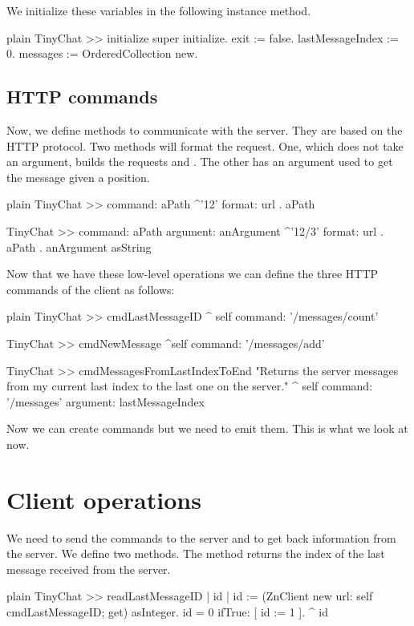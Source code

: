 \documentclass[10pt,twoside,english]{_support/latex/sbabook/sbabook}
\begin{document}
We initialize these variables in the following instance  method.

\begin{displaycode}{plain}
TinyChat >> initialize
	super initialize.
	exit := false.
	lastMessageIndex := 0.
	messages := OrderedCollection new.
\end{displaycode}
\subsection{HTTP commands}
Now, we define methods to communicate with the server. They are based on the HTTP protocol.
Two methods will format the request. One, which does not take an argument, builds the requests
 and . The other has an argument used to get the message given a position.

\begin{displaycode}{plain}
TinyChat >> command: aPath
	^'{1}{2}' format: { url . aPath }

TinyChat >> command: aPath argument: anArgument
	^'{1}{2}/{3}' format: { url . aPath . anArgument asString }
\end{displaycode}

Now that we have these low-level operations we can define the three HTTP commands of the client as follows:

\begin{displaycode}{plain}
TinyChat >> cmdLastMessageID
	^ self command: '/messages/count'

TinyChat >> cmdNewMessage
	^self command: '/messages/add'

TinyChat >> cmdMessagesFromLastIndexToEnd
	"Returns the server messages from my current last index to the last one on the server."
	^ self command: '/messages' argument: lastMessageIndex
\end{displaycode}

Now we can create commands but we need to emit them. This is what we look at now.
\section{Client operations}
We need to send the commands to the server and to get back information from the server.
We define two methods. The method  returns the index of the last message received from the server.

\begin{displaycode}{plain}
TinyChat >> readLastMessageID
	| id |
	id := (ZnClient new url: self cmdLastMessageID; get) asInteger.
	id = 0 ifTrue: [ id := 1 ].
	^ id
\end{displaycode}
\end{document}

